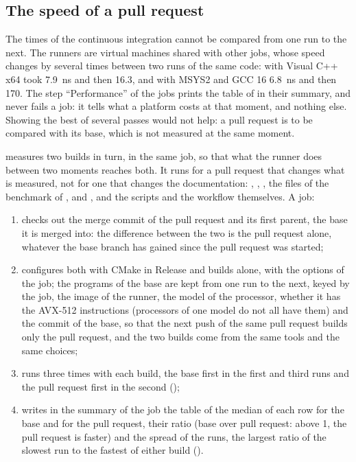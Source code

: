 \documentclass[12pt,a4paper,twoside,openright]{book}
\begin{document}
\subsection{The speed of a pull request}\label{sec:ci-speed}

The times of the continuous integration cannot be compared from one run to
the next. The runners are virtual machines shared with other jobs, whose
speed changes by several times between two runs of the same code:
 with Visual C++ x64 took 7.9~ns and then 16.3, and 
with MSYS2 and GCC 16 6.8~ns and then 170. The step ``Performance'' of the
jobs prints the table of  in their summary, and
never fails a job: it tells what a platform costs at that moment, and
nothing else. Showing the best of several passes would not help: a pull
request is to be compared with its base, which is not measured at the same
moment.

\medskip
{} measures two builds in turn, in the same job, so that
what the runner does between two moments reaches both.\newinvfive{} It runs
for a pull request that changes what is measured, not for one that changes
the documentation: , , ,
the files of the benchmark of , 
and , and the scripts and the workflow themselves. A job:
\begin{enumerate}
\item checks out the merge commit of the pull request and its first parent,
  the base it is merged into: the difference between the two is the pull
  request alone, whatever the base branch has gained since the pull request
  was started;
\item configures both with CMake in Release and builds 
  alone, with the options of the job; the programs of the base are kept
  from one run to the next, keyed by the job, the image of the runner, the
  model of the processor, whether it has the AVX-512 instructions
  (processors of one model do not all have them) and the commit of the
  base, so that the next push of the same pull request builds only the pull
  request, and the two builds come from the same tools and the same
  choices;
\item runs  three times with each build, the base
  first in the first and third runs and the pull request first in the second
  ();
\item writes in the summary of the job the table of the median of each row
  for the base and for the pull request, their ratio (base over pull
  request: above 1, the pull request is faster) and the spread of the runs,
  the largest ratio of the slowest run to the fastest of either build
  ().
\end{enumerate}
\end{document}
